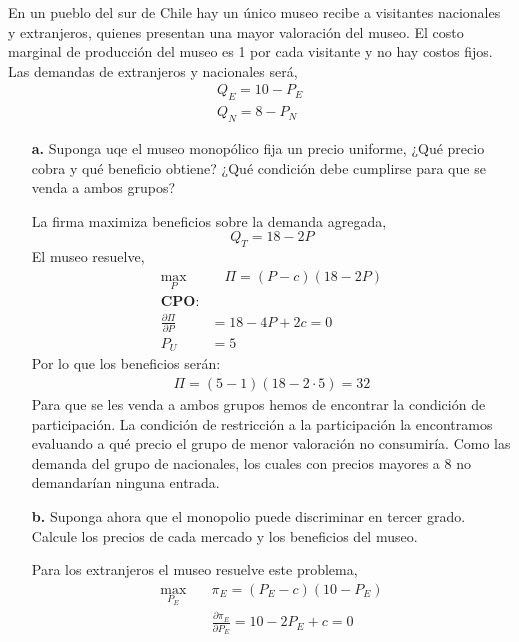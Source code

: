 \documentclass{exam}
\begin{document}
En un pueblo del sur de Chile hay un único museo recibe a visitantes nacionales y extranjeros, quienes presentan una mayor valoración del museo. El costo marginal de producción del museo es 1 por cada visitante y no hay costos fijos. Las demandas de extranjeros y nacionales será,
\begin{align*}
    Q_E = 10-P_E \\
    Q_N = 8 - P_N
\end{align*}
\begin{itemize}
    \item[\textbf{a.}] Suponga uqe el museo monopólico fija un precio uniforme, ¿Qué precio cobra y qué beneficio obtiene? ¿Qué condición debe cumplirse para que se venda a ambos grupos?
    \begin{solution}
        La firma maximiza beneficios sobre la demanda agregada,
        \begin{equation*}
            Q_T = 18-2P
        \end{equation*}
        El museo resuelve,
        \begin{align*}
            \max_{P} & \quad \Pi = (P-c)(18-2P) \\
            \textbf{CPO:} & \\
            \frac{\partial \Pi}{\partial P} & = 18-4P + 2c = 0 \\
            P_U &= 5
        \end{align*}
        Por lo que los beneficios serán:
        \begin{align*}
            \Pi = (5-1)(18-2\cdot 5) = 32
        \end{align*}
        Para que se les venda a ambos grupos hemos de encontrar la condición de participación. La condición de restricción a la participación la encontramos evaluando a qué precio el grupo de menor valoración no consumiría. Como las demanda del grupo de nacionales, los cuales con precios mayores a 8 no demandarían ninguna entrada. 
    \end{solution}
    \item[\textbf{b.}] Suponga ahora que el monopolio puede discriminar en tercer grado. Calcule los precios de cada mercado y los beneficios del museo.
    \begin{solution}
        Para los extranjeros el museo resuelve este problema,
        \begin{align*}
            \max_{P_{E}} \quad & \pi_E = (P_E-c)(10-P_E) \\
            & \frac{\partial  \pi_E}{\partial P_E} = 10 - 2P_E + c = 0 \\

\end{align*}
\end{solution}
\end{itemize}
\end{document}
